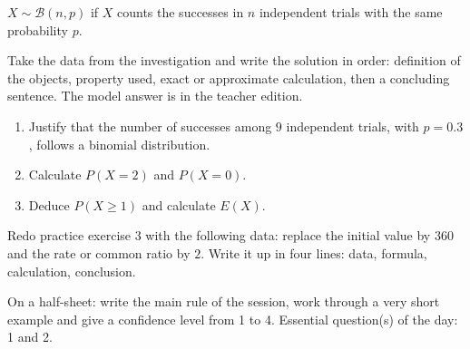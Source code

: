 \begin{traceecrite}$X\sim\mathcal B(n,p)$ if $X$ counts the successes in $n$ independent trials with the same probability $p$.\end{traceecrite}

\begin{exemple}
Take the data from the investigation and write the solution in order: definition of the objects, property used, exact or approximate calculation, then a concluding sentence. The model answer is in the teacher edition.
\end{exemple}

\begin{exercice}[-- essential]
\begin{enumerate}\item Justify that the number of successes among $9$ independent trials, with $p=0.3$, follows a binomial distribution.\item Calculate $P(X=2)$ and $P(X=0)$.\item Deduce $P(X\geq1)$ and calculate $E(X)$.\end{enumerate}
\end{exercice}


\begin{dm}Redo practice exercise 3 with the following data: replace the initial value by $360$ and the rate or common ratio by $2$. Write it up in four lines: data, formula, calculation, conclusion.\end{dm}

\begin{sortie}On a half-sheet: write the main rule of the session, work through a very short example and give a confidence level from 1 to 4. Essential question(s) of the day: 1 and 2.\end{sortie}

